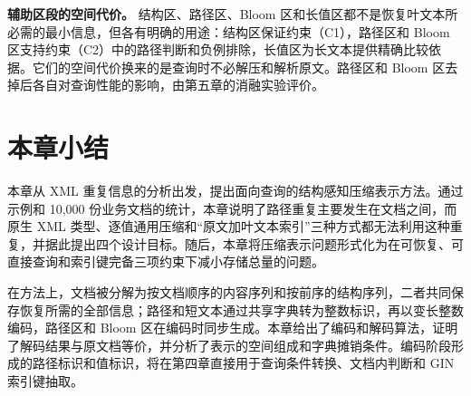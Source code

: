 \textbf{辅助区段的空间代价。} 结构区、路径区、Bloom 区和长值区都不是恢复叶文本所必需的最小信息，但各有明确的用途：结构区保证约束（C1），路径区和 Bloom 区支持约束（C2）中的路径判断和负例排除，长值区为长文本提供精确比较依据。它们的空间代价换来的是查询时不必解压和解析原文。路径区和 Bloom 区去掉后各自对查询性能的影响，由第五章的消融实验评价。

\section{本章小结}

本章从 XML 重复信息的分析出发，提出面向查询的结构感知压缩表示方法。通过示例和 10,000 份业务文档的统计，本章说明了路径重复主要发生在文档之间，而原生 XML 类型、逐值通用压缩和“原文加叶文本索引”三种方式都无法利用这种重复，并据此提出四个设计目标。随后，本章将压缩表示问题形式化为在可恢复、可直接查询和索引键完备三项约束下减小存储总量的问题。

在方法上，文档被分解为按文档顺序的内容序列和按前序的结构序列，二者共同保存恢复所需的全部信息；路径和短文本通过共享字典转为整数标识，再以变长整数编码，路径区和 Bloom 区在编码时同步生成。本章给出了编码和解码算法，证明了解码结果与原文档等价，并分析了表示的空间组成和字典摊销条件。编码阶段形成的路径标识和值标识，将在第四章直接用于查询条件转换、文档内判断和 GIN 索引键抽取。
